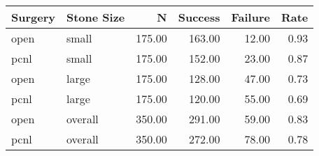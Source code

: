 \begin{table}[ht]
\centering
\begin{tabular}{llrrrr}
  \toprule
{\textbf{Surgery}} & {\textbf{Stone Size}} & {\textbf{N}} & {\textbf{Success}} & {\textbf{Failure}} & {\textbf{Rate}} \\ 
  \midrule
open & small & 175.00 & 163.00 & 12.00 & 0.93 \\ 
  pcnl & small & 175.00 & 152.00 & 23.00 & 0.87 \\ 
  open & large & 175.00 & 128.00 & 47.00 & 0.73 \\ 
  pcnl & large & 175.00 & 120.00 & 55.00 & 0.69 \\ 
  open & overall & 350.00 & 291.00 & 59.00 & 0.83 \\ 
  pcnl & overall & 350.00 & 272.00 & 78.00 & 0.78 \\ 
   \bottomrule
\end{tabular}
\end{table}
